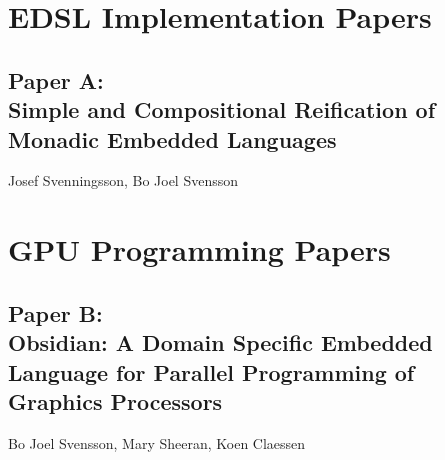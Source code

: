 \documentclass[a4paper]{book}
\newcommand{\paperA}{Paper A}
\newcommand{\paperATitle}{Simple and Compositional Reification of Monadic Embedded Languages}
\newcommand{\paperB}{Paper B}
\newcommand{\paperBTitle}{Obsidian: A Domain Specific Embedded Language for Parallel Programming of Graphics Processors}
\begin{document}
%
%


\chapter{EDSL Implementation Papers}
\label{chap:EDSLImplementation}
% 
\cleardoublepage 


\section[\paperATitle]{\paperA: \\ \paperATitle}
\label{sec:paperA}


\begin{center} 
Josef Svenningsson, Bo Joel Svensson
\end{center}






\chapter{GPU Programming Papers}
\label{chap:GPUProgramming}

% 
\cleardoublepage 

\section[\paperBTitle]{\paperB: \\ \paperBTitle}
\label{sec:paperB}


\begin{center} 
Bo Joel Svensson, Mary Sheeran, Koen Claessen
\end{center}
\end{document}
